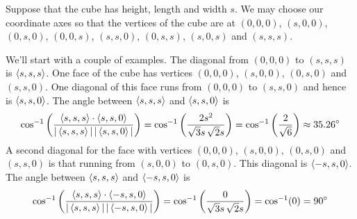 \begin{solution}
Suppose that the cube has height, length and width $s$.
We may choose our coordinate axes so that the vertices
of the cube are at $(0,0,0)$, $(s,0,0)$, $(0,s,0)$, $(0,0,s)$, 
$(s,s,0)$, $(0,s,s)$, $(s,0,s)$ and $(s,s,s)$. 

We'll start with a couple of examples. The diagonal from $(0,0,0)$
to $(s,s,s)$ is $\left< s,s,s\right>$. One face of the cube has vertices $(0,0,0)$,
$(s,0,0)$, $(0,s,0)$ and $(s,s,0)$. One diagonal of this face runs from
$(0,0,0)$ to $(s,s,0)$ and hence is $\left< s,s,0\right>$. The angle between 
$\left< s,s,s\right>$ and $\left< s,s,0\right>$ is
\begin{align*}
\cos^{-1}\left(\frac{\left< s,s,s\right>\cdot\left< s,s,0\right>}
                    {|\left< s,s,s\right>|\,|\left< s,s,0\right>|}\right)
=\cos^{-1}\left(\frac{2s^2}{\sqrt{3}s\,\sqrt{2}s}\right)
=\cos^{-1}\left(\frac{2}{\sqrt{6}}\right)\approx 35.26^\circ
\end{align*}
A second diagonal for the face with vertices  $(0,0,0)$,
$(s,0,0)$, $(0,s,0)$ and $(s,s,0)$ is that running from
$(s,0,0)$ to $(0,s,0)$. This diagonal is $\left< -s,s,0\right>$. The angle between 
$\left< s,s,s\right>$ and $\left< -s,s,0\right>$ is
\begin{align*}
\cos^{-1}\left(\frac{\left< s,s,s\right>\cdot\left< -s,s,0\right>}
               {|\left< s,s,s\right>|\,|\left< -s,s,0\right>|}\right)
=\cos^{-1}\left(\frac{0}{\sqrt{3}s\,\sqrt{2}s}\right)
=\cos^{-1}(0)=90^\circ
\end{align*}


\end{solution}
